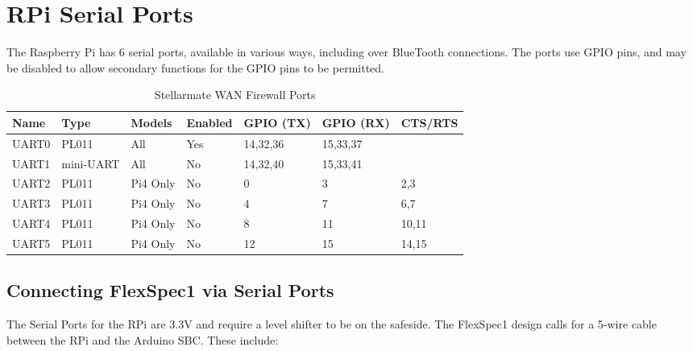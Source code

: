 \section{RPi Serial Ports} \label{sec:RPiSerialPorts}

The Raspberry Pi has 6 serial ports, available in various ways, including
over BlueTooth connections. The ports use GPIO pins, and may be disabled
to allow secondary functions for the GPIO pins to be permitted.

\begin{table}[h!]
\centering
\begin{tabular}{| l | l | l | l | l | l | l |}
\hline
Name   &  Type       &  Models     &  Enabled    &  GPIO (TX)  &  GPIO (RX)  &  CTS/RTS    \\
\hline
UART0  &  PL011      &  All        &  Yes        &  14,32,36   &  15,33,37   &      \\
UART1  &  mini-UART  &  All        &  No         &  14,32,40   &  15,33,41   &      \\
UART2  &  PL011      &  Pi4 Only   &  No         &         0   &         3   &   2,3    \\
UART3  &  PL011      &  Pi4 Only   &  No         &         4   &         7   &   6,7    \\
UART4  &  PL011      &  Pi4 Only   &  No         &         8   &        11   &   10,11    \\
UART5  &  PL011      &  Pi4 Only   &  No         &        12   &        15   &   14,15    \\
\hline
\end{tabular}
\caption[WAN Firewall]{Stellarmate WAN Firewall Ports}
\label{table:StellarmateWANFirewallPorts}
\end{table}

\subsection{Connecting FlexSpec1 via Serial Ports}

The Serial Ports for the RPi are 3.3V and require a level shifter to be
on the safeside. The FlexSpec1 design calls for a 5-wire cable between
the RPi and the Arduino SBC. These include:

